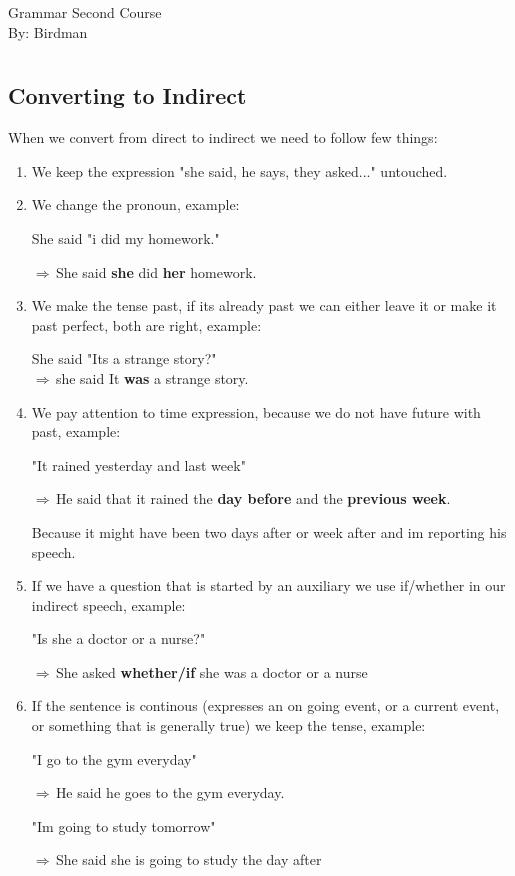 \documentclass[12pt, a4paper]{memoir}
\newcommand{\exarrow}{{\Large{$\Rightarrow$}\,}}
\begin{document}
\begin{center}
\LARGE{Grammar Second Course}\\[0.5cm]
\Large{By: Birdman}\\[1cm]
\end{center}

\section*{}

\subsection*{Converting to Indirect}
{\fontpar
When we convert from direct to indirect we need to follow 
few things:

\begin{enumerate}
\item We keep the expression "she said, he says, they asked..." untouched.
\item We change the pronoun, example:

  She said "i did my homework." 

 \exarrow She said \textbf{she} did \textbf{her} homework.

\item We make the tense past, if its already past we can either
  leave it or make it past perfect, both are right, example:

  She said "Its a strange story?"\\
\exarrow  she said It \textbf{was} a strange story.
\item We pay attention to time expression, because we do not have 
  future with past, example:

  "It rained yesterday and last week"

\exarrow He said that it rained the \textbf{day before} and the 
  \textbf{previous week}.

Because it might have been two days after or week after and 
im reporting his speech.

\item If we have a question that is started by an auxiliary we
  use if/whether in our indirect speech, example:

 "Is she a doctor or a nurse?"

\exarrow She asked \textbf{whether/if} she was a doctor 
  or a nurse

\item If the sentence is continous (expresses an on going event,
  or a current event, or something that is generally true) we keep the
  tense, example:

  "I go to the gym everyday"

  \exarrow He said he goes to the gym everyday.

  "Im going to study tomorrow"

  \exarrow She said she is going to study the day after
\end{enumerate}
}

 
\end{document}
